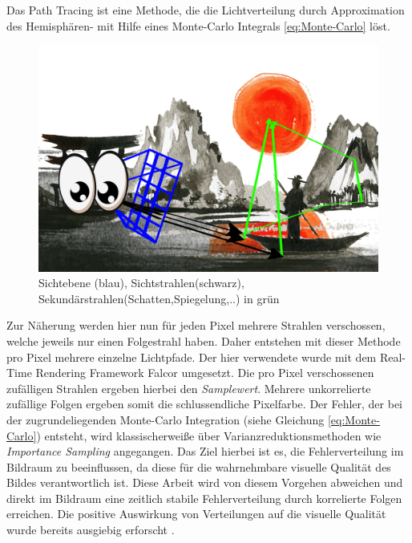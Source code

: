Das Path Tracing ist eine Methode, die die Lichtverteilung durch Approximation des Hemisphären- mit Hilfe eines Monte-Carlo Integrals
\ref{eq:Monte-Carlo} löst. 

\begin{figure}[H]
    \begin{tcolorbox}
    \centering
    \includegraphics[width=\linewidth]{content/PathTracer/Bilder/PathTracerGuide.png}
    \end{tcolorbox}
    \caption{Sichtebene (blau), Sichtstrahlen(schwarz), Sekundärstrahlen(Schatten,Spiegelung,..) in grün}
    \label{pic::GrundkonzeptPathTracing}
\end{figure}

\vspace*{3cm} 
Zur Näherung werden hier nun für jeden Pixel mehrere Strahlen verschossen, welche jeweils nur einen Folgestrahl haben. Daher entstehen
mit dieser Methode pro Pixel mehrere einzelne Lichtpfade.
Der hier verwendete  wurde mit dem Real-Time Rendering Framework Falcor \cite{Benty18} umgesetzt.
Die pro Pixel verschossenen zufälligen Strahlen ergeben hierbei den \textit{Samplewert}. Mehrere
unkorrelierte zufällige Folgen ergeben somit die schlussendliche Pixelfarbe. Der Fehler, der 
bei der zugrundeliegenden Monte-Carlo Integration (siehe Gleichung \ref{eq:Monte-Carlo}) entsteht, 
wird klassischerweiße über Varianzreduktionsmethoden wie \textit{Importance Sampling}
angegangen.
Das Ziel hierbei ist es, die Fehlerverteilung im Bildraum zu beeinflussen, da diese für die wahrnehmbare 
visuelle Qualität des Bildes verantwortlich ist. Diese Arbeit wird von diesem Vorgehen abweichen und direkt im 
Bildraum eine zeitlich stabile 
Fehlerverteilung durch korrelierte Folgen erreichen. Die positive Auswirkung von  
Verteilungen auf die visuelle Qualität wurde bereits ausgiebig erforscht \cite{3288}.
\vfill

